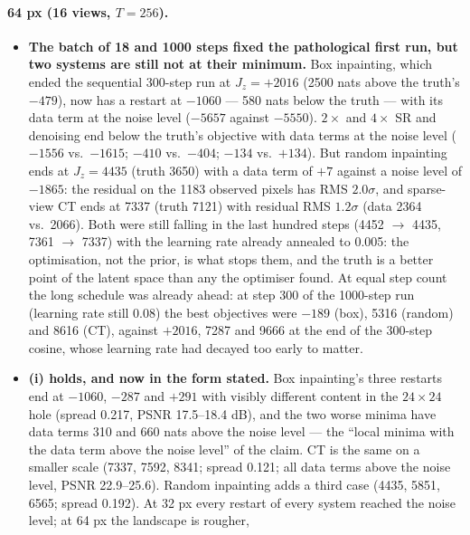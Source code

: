 \documentclass[11pt]{article}
\begin{document}
\paragraph{64 px (16 views, $T = 256$).}
\begin{itemize}
  \item \textbf{The batch of 18 and 1000 steps fixed the pathological
        first run, but two systems are still not at their minimum.} Box
        inpainting, which ended the sequential 300-step run at $J_z =
        +2016$ (2500 nats above the truth's $-479$), now has a restart at
        $-1060$ --- 580 nats below the truth --- with its data term at the
        noise level ($-5657$ against $-5550$). $2\times$ and $4\times$ SR and
        denoising end below the truth's objective with data terms at the
        noise level ($-1556$ vs.\ $-1615$; $-410$ vs.\ $-404$; $-134$ vs.\
        $+134$). But random inpainting ends at $J_z = 4435$ (truth 3650) with
        a data term of $+7$ against a noise level of $-1865$: the residual
        on the 1183 observed pixels has RMS $2.0\sigma$, and sparse-view CT
        ends at 7337 (truth 7121) with residual RMS $1.2\sigma$ (data 2364
        vs.\ 2066). Both were still falling in the last hundred steps
        (4452 $\to$ 4435, 7361 $\to$ 7337) with the learning rate already
        annealed to 0.005: the optimisation, not the prior, is what stops
        them, and the truth is a better point of the latent space than any
        the optimiser found. At equal step count the long schedule was
        already ahead: at step 300 of the 1000-step run (learning rate
        still 0.08) the best objectives were $-189$ (box), 5316 (random)
        and 8616 (CT), against $+2016$, 7287 and 9666 at the end of the
        300-step cosine, whose learning rate had decayed too early to
        matter.
  \item \textbf{(i) holds, and now in the form stated.} Box inpainting's
        three restarts end at $-1060$, $-287$ and $+291$ with visibly
        different content in the $24 \times 24$ hole (spread 0.217, PSNR
        17.5--18.4 dB), and the two worse minima have data terms 310 and 660
        nats above the noise level --- the ``local minima with the data term
        above the noise level'' of the claim. CT is the same on a smaller
        scale (7337, 7592, 8341; spread 0.121; all data terms above the
        noise level, PSNR 22.9--25.6). Random inpainting adds a third case
        (4435, 5851, 6565; spread 0.192). At 32 px every restart of every
        system reached the noise level; at 64 px the landscape is rougher,

\end{itemize}
\end{document}
